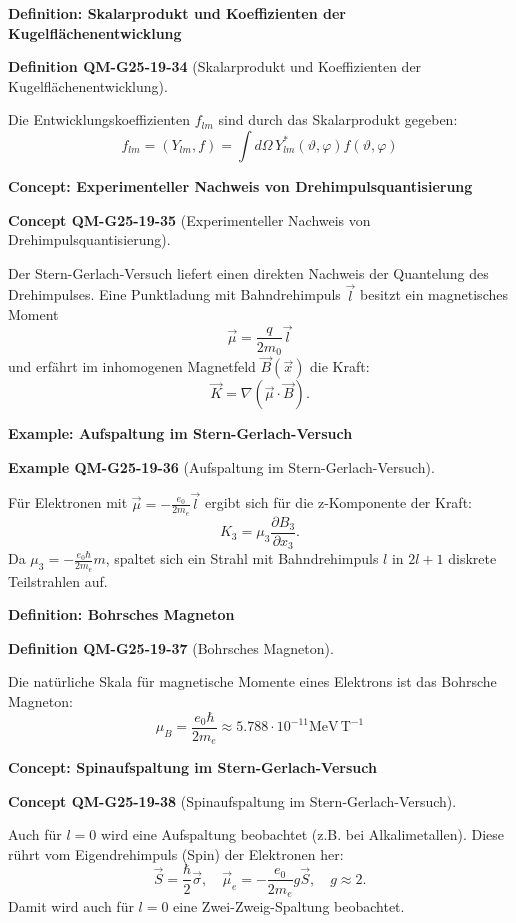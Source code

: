 \documentclass[10pt, letterpaper]{article}
\newcommand{\CustomHeading}[3]{%
  \par\medskip\noindent%
  \textbf{#1 #2} \textnormal{(#3)}.\enskip%
}
\newenvironment{DEF}[2]{\begin{unitbox}\CustomHeading{Definition}{#1}{#2}}{\end{unitbox}}
\newenvironment{EXA}[2]{\begin{unitbox}\CustomHeading{Example}{#1}{#2}}{\end{unitbox}}
\newenvironment{CONC}[2]{\begin{unitbox}\CustomHeading{Concept}{#1}{#2}}{\end{unitbox}}
\begin{document}
\textbf{Definition: Skalarprodukt und Koeffizienten der Kugelflächenentwicklung}  

\begin{DEF}{QM-G25-19-34}{Skalarprodukt und Koeffizienten der Kugelflächenentwicklung}
Die Entwicklungskoeffizienten \(f_{lm}\) sind durch das Skalarprodukt gegeben:
$$
f_{lm} = \left(Y_{lm}, f\right) = \int d\Omega \, Y_{lm}^*(\vartheta, \varphi) f(\vartheta, \varphi)
$$
\end{DEF}


\textbf{Concept: Experimenteller Nachweis von Drehimpulsquantisierung}


\begin{CONC}{QM-G25-19-35}{Experimenteller Nachweis von Drehimpulsquantisierung}
Der Stern-Gerlach-Versuch liefert einen direkten Nachweis der Quantelung des Drehimpulses. Eine Punktladung mit Bahndrehimpuls \(\vec{l}\) besitzt ein magnetisches Moment
$$
\vec{\mu} = \frac{q}{2m_0} \vec{l}
$$
und erfährt im inhomogenen Magnetfeld \(\vec{B}(\vec{x})\) die Kraft:
$$
\vec{K} = \nabla (\vec{\mu} \cdot \vec{B}).
$$
\end{CONC}


\textbf{Example: Aufspaltung im Stern-Gerlach-Versuch}  
\begin{EXA}{QM-G25-19-36}{Aufspaltung im Stern-Gerlach-Versuch}
Für Elektronen mit \(\vec{\mu} = -\frac{e_0}{2m_e} \vec{l}\) ergibt sich für die z-Komponente der Kraft:
$$
K_3 = \mu_3 \frac{\partial B_3}{\partial x_3}.
$$
Da \(\mu_3 = -\frac{e_0 \hbar}{2m_e} m\), spaltet sich ein Strahl mit Bahndrehimpuls \(l\) in \(2l + 1\) diskrete Teilstrahlen auf.
\end{EXA}



\textbf{Definition: Bohrsches Magneton}  

\begin{DEF}{QM-G25-19-37}{Bohrsches Magneton}
Die natürliche Skala für magnetische Momente eines Elektrons ist das Bohrsche Magneton:
$$
\mu_B = \frac{e_0 \hbar}{2m_e} \approx 5.788 \cdot 10^{-11} \mathrm{MeV\, T^{-1}}
$$
\end{DEF}


\textbf{Concept: Spinaufspaltung im Stern-Gerlach-Versuch}  

\begin{CONC}{QM-G25-19-38}{Spinaufspaltung im Stern-Gerlach-Versuch}
Auch für \(l = 0\) wird eine Aufspaltung beobachtet (z.B. bei Alkalimetallen). Diese rührt vom Eigendrehimpuls (Spin) der Elektronen her:
$$
\vec{S} = \frac{\hbar}{2} \vec{\sigma}, \quad \vec{\mu}_e = -\frac{e_0}{2m_e} g \vec{S}, \quad g \approx 2.
$$
Damit wird auch für \(l = 0\) eine Zwei-Zweig-Spaltung beobachtet.
\end{CONC}
\end{document}
